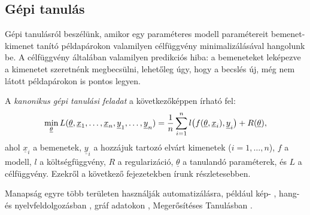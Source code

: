 \subsection{Gépi tanulás}

Gépi tanulásról beszélünk, amikor egy paraméteres modell paramétereit bemenet-kimenet tanító példapárokon valamilyen célfüggvény minimalizálásával hangolunk be. A célfüggvény általában valamilyen predikciós hiba: a bemeneteket leképezve a kimenetet szeretnénk megbecsülni, lehetőleg úgy, hogy a becslés új, még nem látott példapárokon is pontos legyen.



\label{sec:kanonikus.feladat}
A \textit{kanonikus gépi tanulási feladat} \cite{james2013introduction} a következőképpen írható fel:
\[ 
\min\limits_{\underline{\theta}} L(\underline{\theta}, \underline{x}_1, \dots, \underline{x}_n, \underline{y}_1, \dots, \underline{y}_n) = \frac{1}{n}  \sum\limits_{{i}=1}^{n} l\big(f(\underline{\theta}, \underline{x}_i), \underline{y}_i\big) + R(\underline{\theta})
, \]
ahol $ \underline{x}_i $ a bemenetek, $ \underline{y}_i $ a hozzájuk tartozó elvárt kimenetek ($ i = 1, \dots, n $), $ f $ a modell, $ l $ a költségfüggvény, $ R $ a regularizáció, $ \underline{\theta} $ a tanulandó paraméterek, és $ L $ a célfüggvény. Ezekről a következő fejezetekben írunk részletesebben.



Manapság egyre több területen használják automatizálásra, például kép- \cite{krizhevsky2012imagenet, redmon2016you}, hang- \cite{oord2016wavenet} és nyelvfeldolgozásban \cite{mikolov2010recurrent}, gráf adatokon \cite{kipf2016semi}, Megerősítéses Tanulásban \cite{mnih2013playing, silver2016mastering}.%

